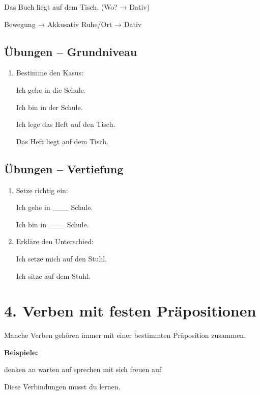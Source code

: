 \documentclass[a4paper,12pt]{article}
\begin{document}
Das Buch liegt auf dem Tisch. (Wo? → Dativ)

\begin{merksatz}
Bewegung → Akkusativ  
Ruhe/Ort → Dativ
\end{merksatz}

\subsection*{Übungen – Grundniveau}

\begin{enumerate}
\item Bestimme den Kasus:

Ich gehe in die Schule.

Ich bin in der Schule.

Ich lege das Heft auf den Tisch.

Das Heft liegt auf dem Tisch.
\end{enumerate}

\subsection*{Übungen – Vertiefung}

\begin{enumerate}
\item Setze richtig ein:

Ich gehe in \_\_\_ Schule.

Ich bin in \_\_\_ Schule.

\item Erkläre den Unterschied:

Ich setze mich auf den Stuhl.

Ich sitze auf dem Stuhl.
\end{enumerate}

\section*{4. Verben mit festen Präpositionen}

Manche Verben gehören immer mit einer bestimmten Präposition zusammen.

\textbf{Beispiele:}

denken an  
warten auf  
sprechen mit  
sich freuen auf  

\begin{achtung}
Diese Verbindungen musst du lernen.
\end{achtung}
\end{document}

